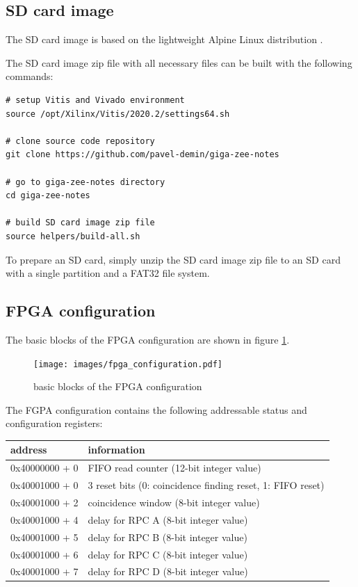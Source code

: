\documentclass[12pt, a4paper]{article}
\begin{document}
\subsection{SD card image}

The SD card image is based on the lightweight Alpine Linux distribution \cite{alpine}.

The SD card image zip file with all necessary files can be built with the following commands:
\vspace{-1ex}
\begin{verbatim}
# setup Vitis and Vivado environment
source /opt/Xilinx/Vitis/2020.2/settings64.sh

# clone source code repository
git clone https://github.com/pavel-demin/giga-zee-notes

# go to giga-zee-notes directory
cd giga-zee-notes

# build SD card image zip file
source helpers/build-all.sh
\end{verbatim}

To prepare an SD card, simply unzip the SD card image zip file to an SD card with a single partition and a FAT32 file system.

\subsection{FPGA configuration}

The basic blocks of the FPGA configuration are shown in figure \ref{fig:fpga_configuration}.

\begin{figure}[h!]
  \centering
  \texttt{[image: images/fpga\_configuration.pdf]}
  \caption{basic blocks of the FPGA configuration}
  \label{fig:fpga_configuration}
\end{figure}

The FGPA configuration contains the following addressable status and configuration registers:
\begin{center}
  \begin{tabular}{|l|l|}
  \hline
  \textbf{address} & \textbf{information} \\
  \hline
  0x40000000 + 0 & FIFO read counter (12-bit integer value) \\
  \hline
  0x40001000 + 0 & 3 reset bits (0: coincidence finding reset, 1: FIFO reset) \\
  \hline
  0x40001000 + 2 & coincidence window (8-bit integer value) \\
  \hline
  0x40001000 + 4 & delay for RPC A (8-bit integer value) \\
  \hline
  0x40001000 + 5 & delay for RPC B (8-bit integer value) \\
  \hline
  0x40001000 + 6 & delay for RPC C (8-bit integer value) \\
  \hline
  0x40001000 + 7 & delay for RPC D (8-bit integer value) \\
  \hline
  \end{tabular}
\end{center}
\end{document}
